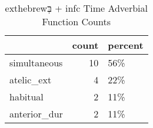 \begin{table}[htbp!]
\centering
\caption{	exthebrew{בְּ} + infc Time Adverbial Function Counts}
\label{table:sadb_both}
\begin{tabular}{lrl}
\toprule
{} &  count & percent \\
\midrule
simultaneous &     10 &     56\% \\
atelic\_ext   &      4 &     22\% \\
habitual     &      2 &     11\% \\
anterior\_dur &      2 &     11\% \\
\bottomrule
\end{tabular}
\end{table}
